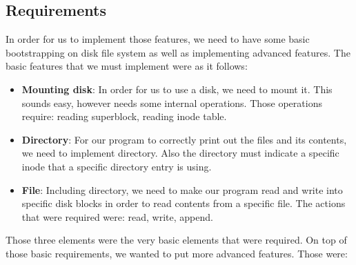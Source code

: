 \documentclass{homework}
\begin{document}
\subsection{Requirements}
In order for us to implement those features, we need to have some basic bootstrapping on disk file system as well as implementing advanced features. The basic features that we must implement were as it follows:
\begin{itemize}
    \item \textbf{Mounting disk}: In order for us to use a disk, we need to mount it. This sounds easy, however needs some internal operations. Those operations require: reading superblock, reading inode table.
    \item \textbf{Directory}: For our program to correctly print out the files and its contents, we need to implement directory. Also the directory must indicate a specific inode that a specific directory entry is using.
    \item \textbf{File}: Including directory, we need to make our program read and write into specific disk blocks in order to read contents from a specific file. The actions that were required were: read, write, append.
\end{itemize}
Those three elements were the very basic elements that were required. On top of those basic requirements, we wanted to put more advanced features. Those were:
\end{document}
